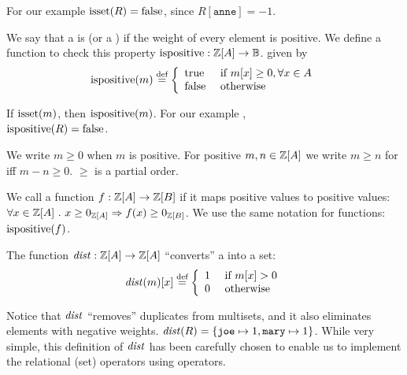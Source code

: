\ifzsetexamples
\noindent For our example $\mbox{isset}(R) = \mbox{false}$, since $R[\texttt{anne}] = -1$.
\fi

\begin{definition}
We say that a \zr is  (or a ) if the weight of every element is
positive.  We define a function to check this property
$\mbox{ispositive} : \mathbb{Z}[A] \rightarrow \mathbb{B}$.
given by
$$\mbox{ispositive}(m) \stackrel{\textrm{\scriptsize def}}{=} \left\{
\begin{array}{ll}
  \mbox{true} & \mbox{ if } m[x] \geq 0, \forall x \in A \\
  \mbox{false} & \mbox{ otherwise}
\end{array}
\right.$$
\end{definition}
If $\mbox{isset}(m)$, then $\mbox{ispositive}(m)$.  For our example \zr, \\
$\mbox{ispositive}(R) = \mbox{false}$.

We write $m \geq 0$ when $m$ is positive.  For positive $m, n \in
\mathbb{Z}[A]$ we write $m \geq n$ for iff $m - n \geq 0$.  $\geq$ is a
partial order.

We call a function $f : \mathbb{Z}[A] \rightarrow \mathbb{Z}[B]$  if it maps
positive values to positive values:
$\forall x \in \mathbb{Z}[A]~.~x \geq 0_{\mathbb{Z}[A]} \Rightarrow f(x) \geq 0_{\mathbb{Z}[B]}$.
We use the same notation for functions: $\mbox{ispositive}(f)$.

\begin{definition}[distinct]
The function $\mathit{dist}: \\ \mathbb{Z}[A] \rightarrow \mathbb{Z}[A]$
``converts'' a \zr into a set:
$$\mathit{dist}(m)[x] \stackrel{\textrm{\scriptsize def}}{=} \left\{
\begin{array}{ll}
  1 & \mbox{ if } m[x] > 0 \\
  0 & \mbox{ otherwise}
\end{array}
\right.
$$
\end{definition}

Notice that $\mathit{dist}$ ``removes'' duplicates from multisets, and it also eliminates
elements with negative weights.
\ifzsetexamples
$\mathit{dist}(R) = \{ \texttt{joe} \mapsto 1, \texttt{mary} \mapsto 1 \}$.
\fi
While very simple, this definition of $\mathit{dist}$ has been carefully
chosen to enable us to implement the relational (set) operators
using \zrs operators.

%
%
